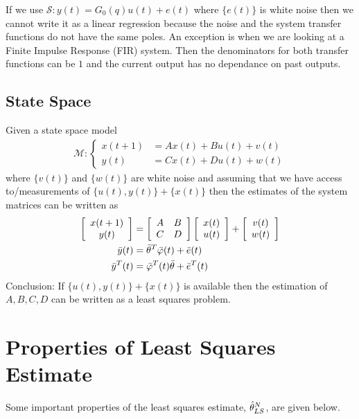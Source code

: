 \documentclass[lecture,12pt,]{pcms-l}
\begin{document}
If we use $\mathcal{S}: y(t) = G_0(q)u(t) + e(t)$ where $\{e(t)\}$ is white noise then we cannot write it as a linear regression because the noise and the system transfer functions do not have the same poles. An exception is when we are looking at a Finite Impulse Response (FIR) system. Then the denominators for both transfer functions can be $1$ and the current output has no dependance on past outputs.

\subsection{State Space}
Given a state space model
\begin{align*}
\mathcal{M}: \begin{cases} x(t+1)&=Ax(t)+Bu(t)+v(t) \\ y(t)&=Cx(t)+Du(t)+w(t) \end{cases}
\end{align*}
where $\{v(t)\}$ and $\{w(t)\}$ are white noise and assuming that we have access to/measurements of $\{u(t),y(t)\} + \{x(t)\}$ then the estimates of the system matrices can be written as
\begin{align}
\left[\begin{array}{c} x(t+1) \\ y(t) \end{array}\right] &=
\left[\begin{array}{c c} A & B \\ C & D \end{array}\right] \left[\begin{array}{c} x(t) \\ u(t) \end{array}\right] +
\left[\begin{array}{c} v(t) \\ w(t) \end{array}\right] \nonumber \\
\bar{y}(t) &= \bar{\theta}^T\bar{\varphi}(t) + \bar{e}(t) \nonumber \\
\bar{y}^T(t) &= \bar{\varphi}^T(t)\bar{\theta} + \bar{e}^T(t)
\end{align}
Conclusion: If $\{u(t),y(t)\} + \{x(t)\}$ is available then the estimation of $A,B,C,D$ can be written as a least squares problem.

\section{Properties of Least Squares Estimate}
Some important properties of the least squares estimate, $\hat{\theta}_{LS}^N$, are given below.
\end{document}
